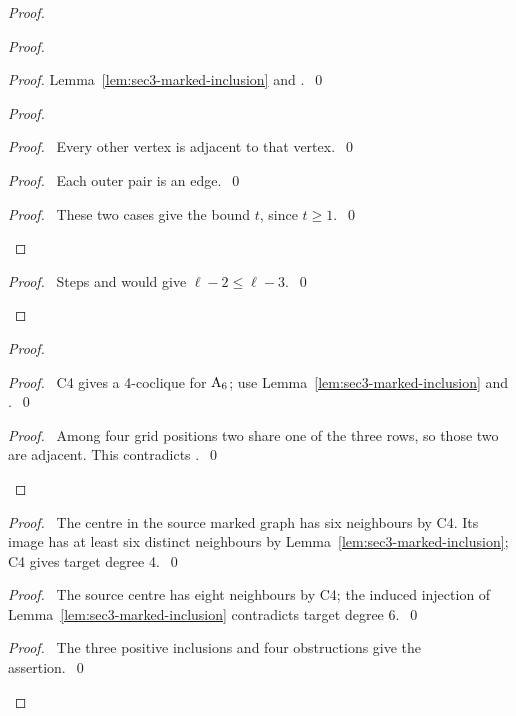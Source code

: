 \begin{proof}
\begin{proof}
\begin{proof}
   Lemma~\ref{lem:sec3-marked-inclusion} and .~\qed\end{proof}
  \begin{proof}
   \begin{proof}\pf\ Every other vertex is adjacent to that vertex.~\qed\end{proof}
   \begin{proof}\pf\ Each outer pair is an edge.~\qed\end{proof}
   \qedstep
   \begin{proof}\pf\ These two cases give the bound $t$, since $t\geq1$.~\qed\end{proof}
  \end{proof}
  \qedstep
  \begin{proof}\pf\ Steps  and 
   would give $\ell-2\leq\ell-3$.~\qed\end{proof}
 \end{proof}
 \begin{proof}
  \begin{proof}\pf\ C4 gives a 4-coclique for $\mathrm{A}_6$; use
   Lemma~\ref{lem:sec3-marked-inclusion} and .~\qed\end{proof}
  \qedstep
  \begin{proof}\pf\ Among four grid positions two share one of the three rows,
   so those two are adjacent. This contradicts .~\qed\end{proof}
 \end{proof}
 \begin{proof}\pf\ The centre in the source marked graph has six neighbours by C4.
  Its image has at least six distinct neighbours by Lemma~\ref{lem:sec3-marked-inclusion};
  C4 gives target degree 4.~\qed\end{proof}
 \begin{proof}\pf\ The source centre has eight neighbours by C4; the induced
  injection of Lemma~\ref{lem:sec3-marked-inclusion} contradicts target degree 6.~\qed\end{proof}
 \qedstep
 \begin{proof}\pf\ The three positive inclusions and four obstructions give the assertion.~\qed\end{proof}
\end{proof}
